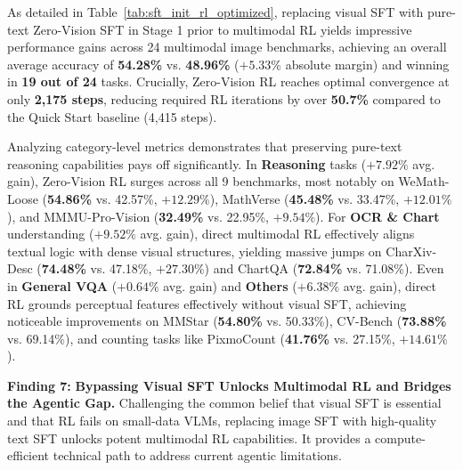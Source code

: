 As detailed in Table~\ref{tab:sft_init_rl_optimized}, replacing visual SFT with pure-text Zero-Vision SFT in Stage 1 prior to multimodal RL yields impressive performance gains across 24 multimodal image benchmarks, achieving an overall average accuracy of \textbf{54.28\%} vs. \textbf{48.96\%} ($+5.33\%$ absolute margin) and winning in \textbf{19 out of 24} tasks. Crucially, Zero-Vision RL reaches optimal convergence at only \textbf{2,175 steps}, reducing required RL iterations by over \textbf{50.7\%} compared to the Quick Start baseline (4,415 steps).

Analyzing category-level metrics demonstrates that preserving pure-text reasoning capabilities pays off significantly. In \textbf{Reasoning} tasks ($+7.92\%$ avg. gain), Zero-Vision RL surges across all 9 benchmarks, most notably on WeMath-Loose (\textbf{54.86\%} vs. 42.57\%, $+12.29\%$), MathVerse (\textbf{45.48\%} vs. 33.47\%, $+12.01\%$), and MMMU-Pro-Vision (\textbf{32.49\%} vs. 22.95\%, $+9.54\%$). For \textbf{OCR \& Chart} understanding ($+9.52\%$ avg. gain), direct multimodal RL effectively aligns textual logic with dense visual structures, yielding massive jumps on CharXiv-Desc (\textbf{74.48\%} vs. 47.18\%, $+27.30\%$) and ChartQA (\textbf{72.84\%} vs. 71.08\%). Even in \textbf{General VQA} ($+0.64\%$ avg. gain) and \textbf{Others} ($+6.38\%$ avg. gain), direct RL grounds perceptual features effectively without visual SFT, achieving noticeable improvements on MMStar (\textbf{54.80\%} vs. 50.33\%), CV-Bench (\textbf{73.88\%} vs. 69.14\%), and counting tasks like PixmoCount (\textbf{41.76\%} vs. 27.15\%, $+14.61\%$).

\begin{promptbox}
\large
\textbf{Finding 7:}
\textbf{Bypassing Visual SFT Unlocks Multimodal RL and Bridges the Agentic Gap.}
Challenging the common belief that visual SFT is essential and that RL fails on small-data VLMs, replacing image SFT with high-quality text SFT unlocks potent multimodal RL capabilities. It provides a compute-efficient technical path to address current agentic limitations.
\end{promptbox}













